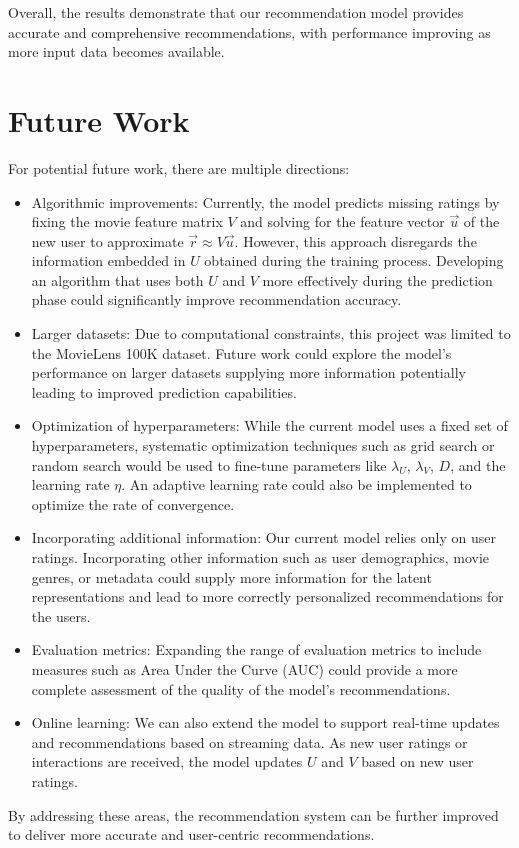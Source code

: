 \documentclass{article}
\begin{document}
Overall, the results demonstrate that our recommendation model provides accurate and comprehensive recommendations, with performance improving as more input data becomes available.

\section{Future Work}
For potential future work, there are multiple directions:
\begin{itemize}
    \item Algorithmic improvements: Currently, the model predicts missing ratings by fixing the movie feature matrix \(V\) and solving for the feature vector \(\vec{u}\) of the new user to approximate \(\vec{r} \approx V \vec{u}\). However, this approach disregards the information embedded in \(U\) obtained during the training process. Developing an algorithm that uses both \(U\) and \(V\) more effectively during the prediction phase could significantly improve recommendation accuracy.

    \item Larger datasets: Due to computational constraints, this project was limited to the MovieLens 100K dataset. Future work could explore the model's performance on larger datasets supplying more information potentially leading to improved prediction capabilities.

    \item Optimization of hyperparameters: While the current model uses a fixed set of hyperparameters, systematic optimization techniques such as grid search or random search would be used to fine-tune parameters like \(\lambda_U\), \(\lambda_V\), \(D\), and the learning rate \(\eta\). An adaptive learning rate could also be implemented to optimize the rate of convergence.

    \item Incorporating additional information: Our current model relies only on user ratings. Incorporating other information such as user demographics, movie genres, or metadata could supply more information for the latent representations and lead to more correctly personalized recommendations for the users.

    \item Evaluation metrics: Expanding the range of evaluation metrics to include measures such as Area Under the Curve (AUC) could provide a more complete assessment of the quality of the model's recommendations.

    \item Online learning: We can also extend the model to support real-time updates and recommendations based on streaming data. As new user ratings or interactions are received, the model updates $U$ and $V$ based on new user ratings.

\end{itemize}
By addressing these areas, the recommendation system can be further improved to deliver more accurate and user-centric recommendations.



\end{document}
